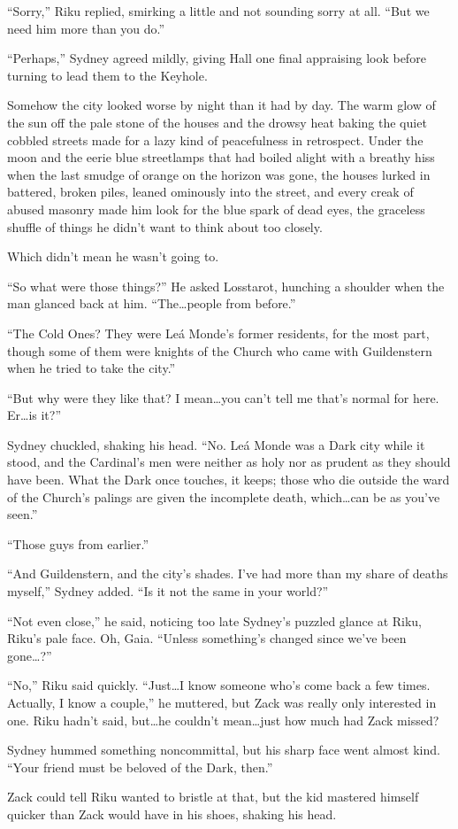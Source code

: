 ``Sorry,'' Riku replied, smirking a little and not sounding sorry at all. ``But we need him more than you do.''

``Perhaps,'' Sydney agreed mildly, giving Hall one final appraising look before turning to lead them to the Keyhole.

Somehow the city looked worse by night than it had by day. The warm glow of the sun off the pale stone of the houses and the drowsy heat baking the quiet cobbled streets made for a lazy kind of peacefulness in retrospect. Under the moon and the eerie blue streetlamps that had boiled alight with a breathy hiss when the last smudge of orange on the horizon was gone, the houses lurked in battered, broken piles, leaned ominously into the street, and every creak of abused masonry made him look for the blue spark of dead eyes, the graceless shuffle of things he didn't want to think about too closely.

Which didn't mean he wasn't going to.
\begin{sloppypar}
``So what were those things?'' He asked Losstarot, hunching a shoulder when the man glanced back at him. ``The\ldots people from before.''
\end{sloppypar}
``The Cold Ones? They were Leá Monde's former residents, for the most part, though some of them were knights of the Church who came with Guildenstern when he tried to take the city.''

``But why were they like that? I mean\ldots you can't tell me that's normal for here. Er\ldots is it?''

Sydney chuckled, shaking his head. ``No. Leá Monde was a Dark city while it stood, and the Cardinal's men were neither as holy nor as prudent as they should have been. What the Dark once touches, it keeps; those who die outside the ward of the Church's palings are given the incomplete death, which\ldots can be as you've seen.''

``Those guys from earlier.''

``And Guildenstern, and the city's shades. I've had more than my share of deaths myself,'' Sydney added. ``Is it not the same in your world?''

``Not even close,'' he said, noticing too late Sydney's puzzled glance at Riku, Riku's pale face. Oh, Gaia. ``Unless something's changed since we've been gone\ldots ?''

``No,'' Riku said quickly. ``Just\ldots I know someone who's come back a few times. Actually, I know a couple,'' he muttered, but Zack was really only interested in one. Riku hadn't said, but\ldots he couldn't mean\ldots just how much had Zack missed?
\begin{sloppypar}
Sydney hummed something noncommittal, but his sharp face went almost kind. ``Your friend must be beloved of the Dark, then.''
\end{sloppypar}
Zack could tell Riku wanted to bristle at that, but the kid mastered himself quicker than Zack would have in his shoes, shaking his head. 

